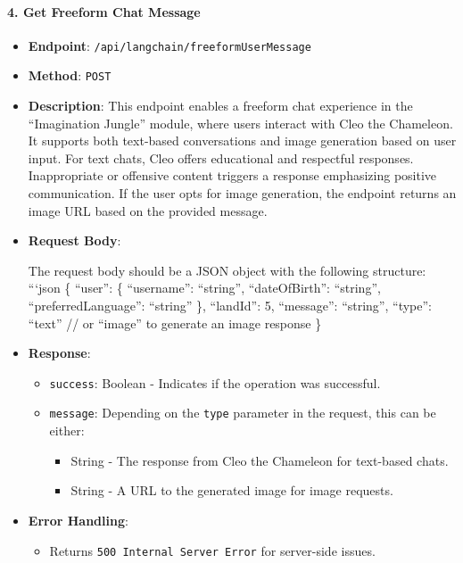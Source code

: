 \hypertarget{get-freeform-chat-message}{%
\paragraph{4. Get Freeform Chat
Message}\label{get-freeform-chat-message}}

\begin{itemize}
\item
  \textbf{Endpoint}: \texttt{/api/langchain/freeformUserMessage}
\item
  \textbf{Method}: \texttt{POST}
\item
  \textbf{Description}: This endpoint enables a freeform chat experience
  in the ``Imagination Jungle'' module, where users interact with Cleo
  the Chameleon. It supports both text-based conversations and image
  generation based on user input. For text chats, Cleo offers
  educational and respectful responses. Inappropriate or offensive
  content triggers a response emphasizing positive communication. If the
  user opts for image generation, the endpoint returns an image URL
  based on the provided message.
\item
  \textbf{Request Body}:

  The request body should be a JSON object with the following structure:
  ```json \{ ``user'': \{ ``username'': ``string'', ``dateOfBirth'':
  ``string'', ``preferredLanguage'': ``string'' \}, ``landId'': 5,
  ``message'': ``string'', ``type'': ``text'' // or ``image'' to
  generate an image response \}
\item
  \textbf{Response}:

  \begin{itemize}
  \tightlist
  \item
    \texttt{success}: Boolean - Indicates if the operation was
    successful.
  \item
    \texttt{message}: Depending on the \texttt{type} parameter in the
    request, this can be either:

    \begin{itemize}
    \tightlist
    \item
      String - The response from Cleo the Chameleon for text-based
      chats.
    \item
      String - A URL to the generated image for image requests.
    \end{itemize}
  \end{itemize}
\item
  \textbf{Error Handling}:

  \begin{itemize}
  \tightlist
  \item
    Returns \texttt{500\ Internal\ Server\ Error} for server-side
    issues.
  \end{itemize}
\end{itemize}

